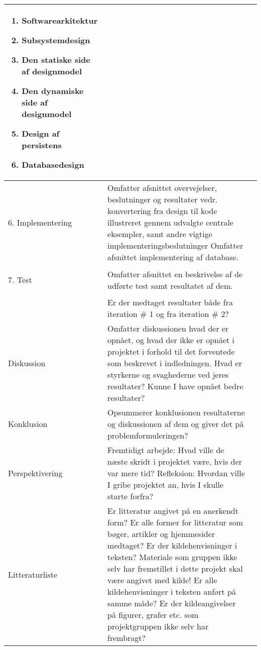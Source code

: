 \begin{center}
\begin{longtable}{|m{3.5cm}|m{10cm}|m{2.5cm}|}
\begin{enumerate}
\item Softwarearkitektur
\item Subsystemdesign
\item Den statiske side af designmodel
\item Den dynamiske side af designmodel
\item Design af persistens
\item Databasedesign
\end{enumerate}
& \\ \hline
\begin{flushright}
6. Implementering
\end{flushright} 
& Omfatter afsnittet overvejelser, beslutninger og resultater vedr.  konvertering fra design til kode illustreret gennem udvalgte centrale eksempler, samt andre vigtige implementeringsbeslutninger\newline
Omfatter afsnittet implementering af database. & \\ 
\hline
\begin{flushright}
7. Test
\end{flushright}
& Omfatter afsnittet en beskrivelse af de udførte test samt resultatet af dem. & \\
\hline
& Er der medtaget resultater både fra iteration \# 1 og fra iteration \# 2? & \\ 
\hline
Diskussion &
Omfatter diskussionen hvad der er opnået, og hvad der ikke er opnået i projektet i forhold til det forventede som beskrevet i indledningen. \newline
Hvad er styrkerne og svaghederne ved jeres resultater? \newline
Kunne I have opnået bedre resultater?
& \\ \hline
Konklusion & Opsummerer konklusionen resultaterne og diskussionen af dem og giver det på problemformuleringen?  & \\
\hline
Perspektivering & 
Fremtidigt arbejde: Hvad ville de næste skridt i projektet være, hvis der var mere tid?\newline
Refleksion: Hvordan ville I gribe projektet an, hvis I skulle starte forfra? & \\
\hline
Litteraturliste & 
Er litteratur angivet på en anerkendt form? \newline
Er alle former for litteratur som bøger, artikler og hjemmesider medtaget? \newline
Er der kildehenvisninger i teksten? Materiale som gruppen ikke selv har fremstillet i dette projekt skal være angivet med kilde! \newline
Er alle kildehenvisninger i teksten anført på samme måde? \newline
Er der kildeangivelser på figurer, grafer etc. som projektgruppen ikke selv har frembragt? & \\
\hline
\end{longtable}
\end{center}


